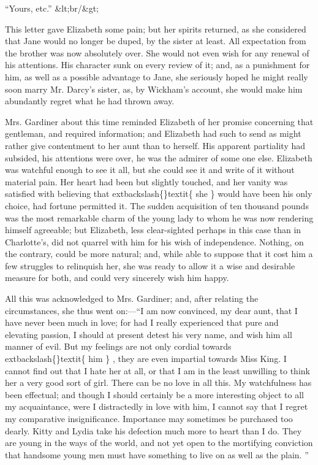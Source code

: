 \documentclass[10pt]{book}
\begin{document}
    “Yours, etc.”
    &lt;br/&gt;

   This letter gave Elizabeth some pain; but her spirits returned, as she
considered that Jane would no longer be duped, by the sister at least.
All expectation from the brother was now absolutely over. She would not
even wish for any renewal of his attentions. His character sunk on every
review of it; and, as a punishment for him, as well as a possible
advantage to Jane, she seriously hoped he might really soon marry Mr.
Darcy’s sister, as, by Wickham’s account, she would make him abundantly
regret what he had thrown away.
  

   Mrs. Gardiner about this time reminded Elizabeth of her promise
concerning that gentleman, and required information; and Elizabeth had
such to send as might rather give contentment to her aunt than to
herself. His apparent partiality had subsided, his attentions were over,
he was the admirer of some one else. Elizabeth was
   watchful enough to
see it all, but she could see it and write of it without material pain.
Her heart had been but slightly touched, and her vanity was satisfied
with believing that
   	extbackslash\{\}textit\{
    she
   \}
   would have been his only choice, had fortune
permitted it. The sudden acquisition of ten thousand pounds was the most
remarkable charm of the young lady to whom he was now rendering himself
agreeable; but Elizabeth, less clear-sighted perhaps in this case than
in Charlotte’s, did not quarrel with him for his wish of independence.
Nothing, on the contrary, could be more natural; and, while able to
suppose that it cost him a few struggles to relinquish her, she was
ready to allow it a wise and desirable measure for both, and could very
sincerely wish him happy.
  

   All this was acknowledged to Mrs. Gardiner; and, after relating the
circumstances, she thus went on:—“I am now convinced, my dear aunt,
that I have never been much in love; for had I really experienced that
pure and elevating passion, I should at present detest his very name,
and wish him all manner of evil. But my feelings are not only cordial
towards
   	extbackslash\{\}textit\{
    him
   \}
   , they are even impartial towards Miss King. I cannot find
out that I hate her at all, or that I am in the least unwilling to think
her a very good sort of girl. There can be no love in all this. My
watchfulness has been effectual; and though I should certainly be a more
interesting object to all my acquaintance, were I distractedly in love
with him, I cannot say that I regret my comparative insignificance.
Importance may sometimes be purchased too dearly. Kitty and Lydia take
his defection much more to heart than I do. They are young in the ways
of the world, and not yet open to the mortifying conviction that
handsome young men must have something to live on as well as the
plain.
   ”
  
\end{document}
